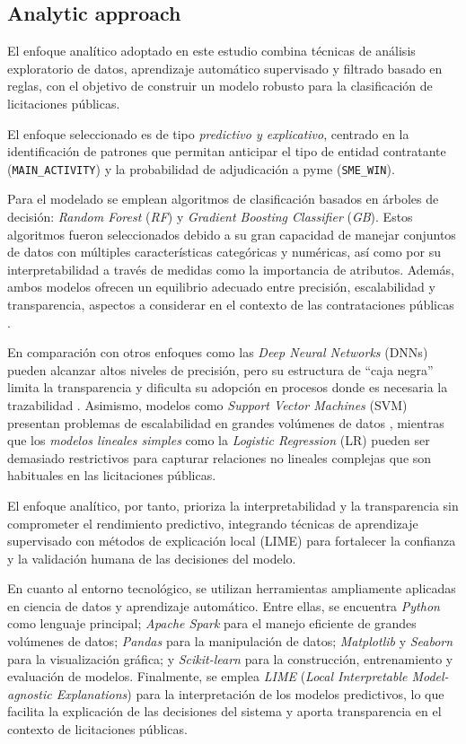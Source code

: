 \documentclass[a4paper,fleqn]{cas-sc}
\begin{document}
 
  \subsection{Analytic approach}\label{sec:fase2}
  
  El enfoque analítico adoptado en este estudio combina técnicas de análisis exploratorio de datos, aprendizaje automático supervisado y filtrado basado en reglas, con el objetivo de construir un modelo robusto para la clasificación de licitaciones públicas.
  

 	El enfoque seleccionado es de tipo \textit{predictivo y explicativo}, centrado en la identificación de patrones que permitan anticipar el tipo de entidad contratante (\texttt{MAIN\_ACTIVITY}) y la probabilidad de adjudicación a pyme (\texttt{SME\_WIN}).

  Para el modelado se emplean algoritmos de clasificación basados en árboles de decisión: \textit{Random Forest} (\textit{RF}) y \textit{Gradient Boosting Classifier} (\textit{GB}). Estos algoritmos fueron seleccionados debido a su gran  capacidad de manejar conjuntos de datos con múltiples características categóricas y numéricas, así como por su interpretabilidad a través de medidas como la importancia de atributos. 
	Además, ambos modelos ofrecen un  equilibrio adecuado entre precisión, escalabilidad y transparencia, aspectos a considerar en el contexto de las contrataciones públicas \cite{friedman2001greedy,breiman2001random}.

  	En comparación con otros enfoques como las \textit{Deep Neural Networks} (DNNs) pueden alcanzar altos niveles de precisión, pero su estructura de ``caja negra'' limita la transparencia y dificulta su adopción en procesos donde es necesaria la trazabilidad \cite{lipton2018mythos}. Asimismo, modelos como \textit{Support Vector Machines} (SVM) presentan problemas de escalabilidad en grandes volúmenes de datos \cite{joachims1998text}, mientras que los \textit{modelos lineales simples} como la \textit{Logistic Regression} (LR) pueden ser demasiado restrictivos para capturar relaciones no lineales complejas que son habituales en las licitaciones públicas.

 	El enfoque analítico, por tanto, prioriza la interpretabilidad y la transparencia sin comprometer el rendimiento predictivo, integrando técnicas de aprendizaje supervisado con métodos de explicación local (LIME) para fortalecer la confianza y la validación humana de las decisiones del modelo.
  
    En cuanto al entorno tecnológico, se utilizan herramientas ampliamente aplicadas en ciencia de datos y aprendizaje automático. Entre ellas, se encuentra  \textit{Python} como lenguaje principal; \textit{Apache Spark} para el manejo eficiente de grandes volúmenes de datos; \textit{Pandas} para la manipulación de datos; \textit{Matplotlib} y \textit{Seaborn} para la visualización gráfica; y \textit{Scikit-learn} para la construcción, entrenamiento y evaluación de modelos. Finalmente, se emplea \textit{LIME} (\textit{Local Interpretable Model-agnostic Explanations}) para la interpretación de los modelos predictivos, lo que facilita la explicación de las decisiones del sistema y aporta transparencia en el contexto de licitaciones públicas.
  
\end{document}

